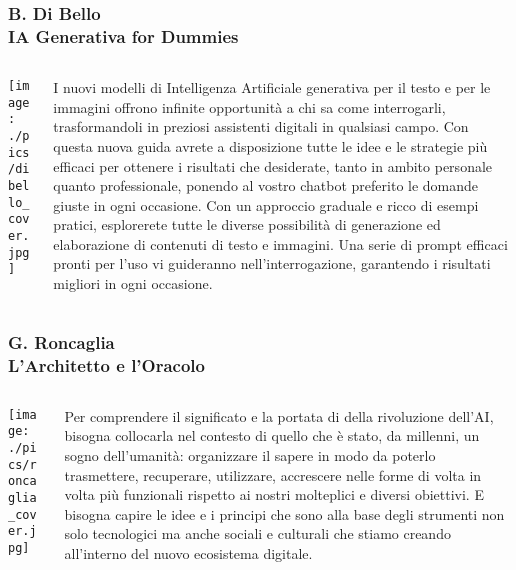 \documentclass[aspectratio=169]{beamer}
\begin{document}
%
%
\begin{frame}
\frametitle{\small B. Di Bello \\ \normalsize \textbf{IA Generativa for Dummies}}
\begin{columns}[c]
\begin{column}{0.35\textwidth}
    \centering
    \texttt{[image: ./pics/dibello\_cover.jpg]}
\end{column}
\begin{column}{0.6\textwidth}
    {\small
I nuovi modelli di Intelligenza Artificiale generativa per il testo e per le immagini offrono infinite opportunità a chi sa come interrogarli, trasformandoli in preziosi assistenti digitali in qualsiasi campo. Con questa nuova guida avrete a disposizione tutte le idee e le strategie più efficaci per ottenere i risultati che desiderate, tanto in ambito personale quanto professionale, ponendo al vostro chatbot preferito le domande giuste in ogni occasione. Con un approccio graduale e ricco di esempi pratici, esplorerete tutte le diverse possibilità di generazione ed elaborazione di contenuti di testo e immagini. Una serie di prompt efficaci pronti per l’uso vi guideranno nell’interrogazione, garantendo i risultati migliori in ogni occasione.
}
\end{column}
\end{columns}
\end{frame}
%
%
\begin{frame}
\frametitle{\small G. Roncaglia  \\ \normalsize \textbf{L'Architetto e l'Oracolo}}
\begin{columns}[c]
\begin{column}{0.35\textwidth}
    \centering
    \texttt{[image: ./pics/roncaglia\_cover.jpg]}
\end{column}
\begin{column}{0.6\textwidth}
    {\small
Per comprendere il significato e la portata di della rivoluzione dell'AI, bisogna collocarla nel contesto di quello che è stato, da millenni, un sogno dell’umanità: organizzare il sapere in modo da poterlo trasmettere, recuperare, utilizzare, accrescere nelle forme di volta in volta più funzionali rispetto ai nostri molteplici e diversi obiettivi. E bisogna capire le idee e i principi che sono alla base degli strumenti non solo tecnologici ma anche sociali e culturali che stiamo creando all’interno del nuovo ecosistema digitale.
}
\end{column}
\end{columns}
\end{frame}
\end{document}

